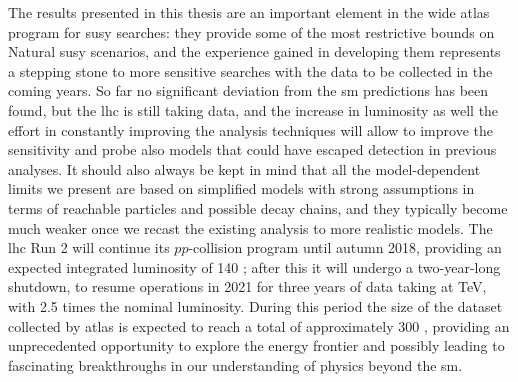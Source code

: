 The results presented in this thesis are an important element in the wide \gls{atlas} program 
for \gls{susy} searches: they  
provide some of the most restrictive bounds on Natural \gls{susy} scenarios, 
and the experience gained in developing them represents a stepping stone to more sensitive searches 
with the data to be collected in the coming years.
So far no significant deviation from the \gls{sm} predictions has been found,
but the \gls{lhc} is still taking data, and the increase in luminosity
as well the effort in constantly improving the analysis techniques 
will allow to improve the sensitivity and probe also models that could have 
escaped detection in previous analyses. 
It should also always be kept in mind that all the model-dependent limits we present are 
based on simplified models with strong assumptions in terms of reachable particles and 
possible decay chains, and they typically become much weaker once we recast the existing analysis 
to more realistic models. 
The \gls{lhc} Run 2 will continue its $pp$-collision program until autumn 2018, 
providing an expected integrated luminosity of 140 \ifb; 
after this it will undergo a two-year-long shutdown, to resume operations 
in 2021 for three years of data taking at \cmfour TeV, with 2.5 times the 
nominal luminosity. 
During this period the size of the dataset collected by \gls{atlas} is expected to reach a total of approximately 300 \ifb, providing an unprecedented opportunity to explore the energy frontier and possibly leading to fascinating breakthroughs in our understanding of physics beyond the \gls{sm}. 
 

 




